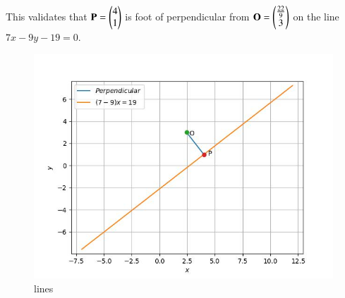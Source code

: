 \documentclass[journal,12pt,twocolumn]{IEEEtran}
\renewcommand{\vec}[1]{\boldsymbol{\mathbf{#1}}}
\begin{document}
This validates that $\vec{P} = \myvec{4\\1}$ is foot of perpendicular from $\vec{O} = \myvec{\frac{22}{9} \\ 3}$ on the line $7{x} - 9{y} - 19 = 0$.

\begin{figure}[!htb]
    \centering
    \includegraphics[width=\columnwidth]{figs/lines.jpg}
    \caption{lines}
    \label{fig:lines}
\end{figure}
\end{document}
